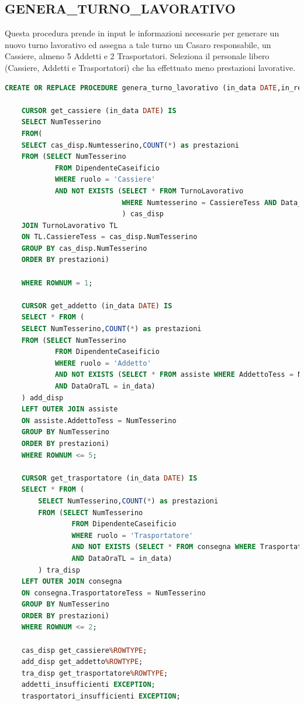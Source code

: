 \documentclass[12pt]{report}
\begin{document}
\subsection*{GENERA\_TURNO\_LAVORATIVO}
Questa procedura prende in input le informazioni necessarie per generare un nuovo turno lavorativo ed assegna a tale turno un Casaro responsabile, un Cassiere, almeno 5 Addetti e 2 Trasportatori. Seleziona il personale libero (Cassiere, Addetti e Trasportatori) che ha effettuato meno prestazioni lavorative.

\begin{lstlisting}[language=SQL,caption={GENERA\_TURNO\_LAVORATIVO}]
    CREATE OR REPLACE PROCEDURE genera_turno_lavorativo (in_data DATE,in_reparto CHAR, in_casaro CHAR) IS
    
    CURSOR get_cassiere (in_data DATE) IS 
    SELECT NumTesserino
    FROM(
    SELECT cas_disp.Numtesserino,COUNT(*) as prestazioni
    FROM (SELECT NumTesserino 
            FROM DipendenteCaseificio
            WHERE ruolo = 'Cassiere'
            AND NOT EXISTS (SELECT * FROM TurnoLavorativo
                            WHERE Numtesserino = CassiereTess AND Data_Ora = in_data)
                            ) cas_disp
    JOIN TurnoLavorativo TL
    ON TL.CassiereTess = cas_disp.NumTesserino 
    GROUP BY cas_disp.NumTesserino
    ORDER BY prestazioni)
    
    WHERE ROWNUM = 1;

    CURSOR get_addetto (in_data DATE) IS 
    SELECT * FROM (
    SELECT NumTesserino,COUNT(*) as prestazioni
    FROM (SELECT NumTesserino
            FROM DipendenteCaseificio
		    WHERE ruolo = 'Addetto'
		    AND NOT EXISTS (SELECT * FROM assiste WHERE AddettoTess = NumTesserino
		    AND DataOraTL = in_data)
    ) add_disp
    LEFT OUTER JOIN assiste 
    ON assiste.AddettoTess = NumTesserino
    GROUP BY NumTesserino
    ORDER BY prestazioni)
    WHERE ROWNUM <= 5;
    
    CURSOR get_trasportatore (in_data DATE) IS 
    SELECT * FROM (
        SELECT NumTesserino,COUNT(*) as prestazioni
        FROM (SELECT NumTesserino
                FROM DipendenteCaseificio
                WHERE ruolo = 'Trasportatore'
                AND NOT EXISTS (SELECT * FROM consegna WHERE TrasportatoreTess = NumTesserino
                AND DataOraTL = in_data)
        ) tra_disp
    LEFT OUTER JOIN consegna 
    ON consegna.TrasportatoreTess = NumTesserino
    GROUP BY NumTesserino
    ORDER BY prestazioni)
    WHERE ROWNUM <= 2;
    
    cas_disp get_cassiere%ROWTYPE;
    add_disp get_addetto%ROWTYPE;
    tra_disp get_trasportatore%ROWTYPE;
    addetti_insufficienti EXCEPTION;
    trasportatori_insufficienti EXCEPTION;
    

\end{lstlisting}
\end{document}
